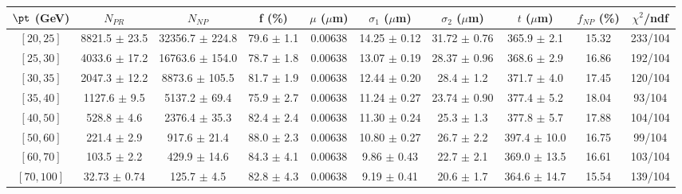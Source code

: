 \begin{tabular}{c||c|c|c|c|c|c|c||c|c}
$\pt$ (GeV) & $N_{PR}$ & $N_{NP}$ & f (\%) & $\mu$ ($\mu$m) & $\sigma_1$ ($\mu$m) & $\sigma_2$ ($\mu$m)  & $t$ ($\mu$m) & $f_{NP}$ (\%) & $\chi^2$/ndf \\
\hline
$[20, 25]$ & 8821.5 $\pm$ 23.5 & 32356.7 $\pm$ 224.8 & 79.6 $\pm$ 1.1 & 0.00638 & 14.25 $\pm$ 0.12 & 31.72 $\pm$ 0.76 & 365.9 $\pm$ 2.1 & 15.32 & 233/104\\
$[25, 30]$ & 4033.6 $\pm$ 17.2 & 16763.6 $\pm$ 154.0 & 78.7 $\pm$ 1.8 & 0.00638 & 13.07 $\pm$ 0.19 & 28.37 $\pm$ 0.96 & 368.6 $\pm$ 2.9 & 16.86 & 192/104\\
$[30, 35]$ & 2047.3 $\pm$ 12.2 & 8873.6 $\pm$ 105.5 & 81.7 $\pm$ 1.9 & 0.00638 & 12.44 $\pm$ 0.20 & 28.4 $\pm$ 1.2 & 371.7 $\pm$ 4.0 & 17.45 & 120/104\\
$[35, 40]$ & 1127.6 $\pm$ 9.5 & 5137.2 $\pm$ 69.4 & 75.9 $\pm$ 2.7 & 0.00638 & 11.24 $\pm$ 0.27 & 23.74 $\pm$ 0.90 & 377.4 $\pm$ 5.2 & 18.04 & 93/104\\
$[40, 50]$ & 528.8 $\pm$ 4.6 & 2376.4 $\pm$ 35.3 & 82.4 $\pm$ 2.4 & 0.00638 & 11.30 $\pm$ 0.24 & 25.3 $\pm$ 1.3 & 377.8 $\pm$ 5.7 & 17.88 & 104/104\\
$[50, 60]$ & 221.4 $\pm$ 2.9 & 917.6 $\pm$ 21.4 & 88.0 $\pm$ 2.3 & 0.00638 & 10.80 $\pm$ 0.27 & 26.7 $\pm$ 2.2 & 397.4 $\pm$ 10.0 & 16.75 & 99/104\\
$[60, 70]$ & 103.5 $\pm$ 2.2 & 429.9 $\pm$ 14.6 & 84.3 $\pm$ 4.1 & 0.00638 & 9.86 $\pm$ 0.43 & 22.7 $\pm$ 2.1 & 369.0 $\pm$ 13.5 & 16.61 & 103/104\\
$[70, 100]$ & 32.73 $\pm$ 0.74 & 125.7 $\pm$ 4.5 & 82.8 $\pm$ 4.3 & 0.00638 & 9.19 $\pm$ 0.41 & 20.6 $\pm$ 1.7 & 364.6 $\pm$ 14.7 & 15.54 & 139/104\\
\end{tabular}

